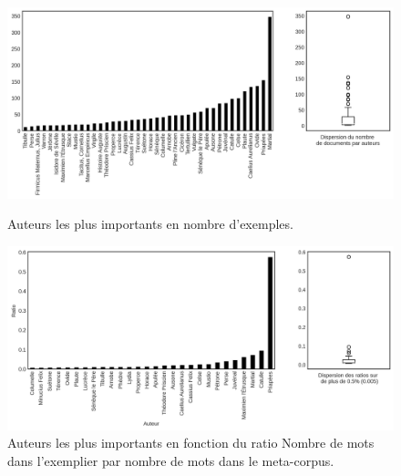 \begin{figure}[ht]
    \centering
    \includegraphics[width=\linewidth]{figures/chap1/part3/exemplier/auteurs_exemplier_absolus.png}
    \caption{Auteurs les plus importants en nombre d'exemples.}
    \label{fig:chap1:nb_extraits_auteur}
    \includegraphics[width=\linewidth]{figures/chap1/part3/exemplier/auteurs_exemplier_motsrelatifs.png}
    \caption{Auteurs les plus importants en fonction du ratio Nombre de mots dans l'exemplier par nombre de mots dans le meta-corpus.}
    \label{fig:chap1:nb_extraits_auteur_rel}
\end{figure}

